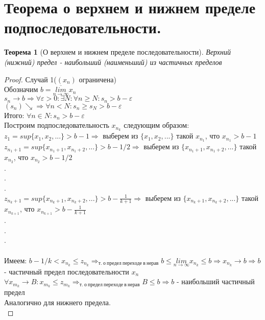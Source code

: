 \documentclass[12pt, a4]{article}
\newtheorem*{theorem}{Теорема}
\renewcommand{\lim}[2]{\underset{#1 \rightarrow #2}{lim}}
\newcommand{\limn}{\lim{n}{\infty}}
\renewcommand{\implies}{\Rightarrow}
\renewcommand{\epsilon}{\varepsilon}
\newcommand{\limsupn}{\overline{\limn}}
\begin{document}
\section{Теорема о верхнем и нижнем пределе подпоследовательности.}

\begin{theorem}[О верхнем и нижнем пределе последовательности]
Верхний (нижний) предел - наибольший (наименьший) из частичных пределов
\end{theorem}

\begin{proof}
\item{Случай 1}($(x_n)$ ограничена)\\
Обозначим $b = \limsupn x_n$\\
$s_n \to b \implies \forall \epsilon > 0: \exists N: \forall n \geq N: s_n > b - \epsilon$\\
$(s_n)\searrow \implies \forall n < N: s_n \geq s_N > b - \epsilon$\\
Итого: $\forall n \in N: s_n > b - \epsilon$\\
Построим подпоследовательность $x_{n_k}$ следующим образом:\\
$z_1 = sup\{x_1, x_2, ...\} > b - 1 \implies$ выберем из $\{x_1, x_2, ...\}$ такой $x_{n_1}$, что $x_{n_1} > b - 1$\\
$z_{n_1+1} = sup\{x_{n_1+1}, x_{n_1+2}, ...\} > b - 1/2 \implies$ выберем из $\{x_{n_1+1}, x_{n_1+2}, ...\}$ такой $x_{n_2}$, что $x_{n_2} > b - 1/2$\\
.\\
.\\
.\\
$z_{n_k+1} = sup\{x_{n_k+1}, x_{n_k+2}, ...\} > b - \frac{1}{k+1} \implies$ выберем из $\{x_{n_k+1}, x_{n_k+2}, ...\}$ такой $x_{n_{k+1}}$, что $x_{n_{k+1}} > b - \frac{1}{k+1}$\\
.\\
.\\
.\\
\bigskip\\

Имеем: $b - 1/k < x_{n_k} \leq z_{n_k} \implies_{т.\ о\ предел\ переходе\ в\ нерав} b \leq \limn x_{n_k} \leq b \implies x_{n_k} \to b \implies b $ - частичный предел последовательности $x_n$\\
$\forall x_{m_k} \to B: x_{m_k} \leq z_{m_k} \implies_{т.\ о\ предел\ переходе\ в\ нерав} B \leq b \implies b$ - наибольший частичный предел\\
Аналогично для нижнего предела.\\


\end{proof}
\end{document}
